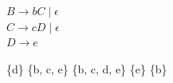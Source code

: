 \documentclass[12pt, addpoints]{exam}
\begin{document}
\begin{questions}
$B \rightarrow bC \mid \epsilon$\\

$C \rightarrow cD \mid \epsilon$\\

$D \rightarrow e$\\
\begin{choices}
\choice \{d\}
\choice \{b, c, e\}
\choice \{b, c, d, e\}
\choice \{e\}
\choice \{b\}
\end{choices}



    \end{questions}
    
\end{document}
